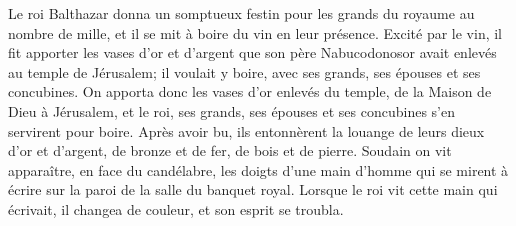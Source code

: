 Le roi Balthazar donna un somptueux festin pour les grands du royaume au nombre de mille,
	et il se mit à boire du vin en leur présence.
Excité par le vin, il fit apporter les vases d’or et d’argent
		que son père Nabucodonosor avait enlevés au temple de Jérusalem;
	il voulait y boire, avec ses grands, ses épouses et ses concubines.
On apporta donc les vases d’or enlevés du temple, de la Maison de Dieu à Jérusalem,
	et le roi, ses grands, ses épouses et ses concubines s’en servirent pour boire.
Après avoir bu, ils entonnèrent la louange de leurs dieux d’or et d’argent,
		de bronze et de fer, de bois et de pierre.
Soudain on vit apparaître, en face du candélabre, les doigts d’une main d’homme
	qui se mirent à écrire sur la paroi de la salle du banquet royal.
Lorsque le roi vit cette main qui écrivait,
	il changea de couleur, et son esprit se troubla.
